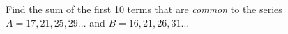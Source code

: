 
%
%
%
%
% 
% 

\question[4] Find the sum of the first 10 terms that are \textit{common} to the series 
$A = 17,21,25,29 ...$ and $B = 16,21,26,31 ...$


\ifprintanswers
\fi 

